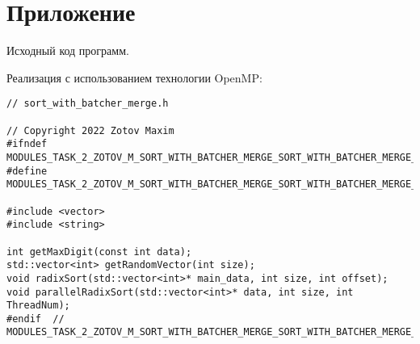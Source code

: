 \documentclass{report}
\begin{document}
\section*{Приложение}
Исходный код программ.
\par Реализация с использованием технологии OpenMP:
\begin{lstlisting}
// sort_with_batcher_merge.h

// Copyright 2022 Zotov Maxim
#ifndef MODULES_TASK_2_ZOTOV_M_SORT_WITH_BATCHER_MERGE_SORT_WITH_BATCHER_MERGE_H_
#define MODULES_TASK_2_ZOTOV_M_SORT_WITH_BATCHER_MERGE_SORT_WITH_BATCHER_MERGE_H_

#include <vector>
#include <string>

int getMaxDigit(const int data);
std::vector<int> getRandomVector(int size);
void radixSort(std::vector<int>* main_data, int size, int offset);
void parallelRadixSort(std::vector<int>* data, int size, int ThreadNum);
#endif  // MODULES_TASK_2_ZOTOV_M_SORT_WITH_BATCHER_MERGE_SORT_WITH_BATCHER_MERGE_H_

\end{lstlisting}
\end{document}
